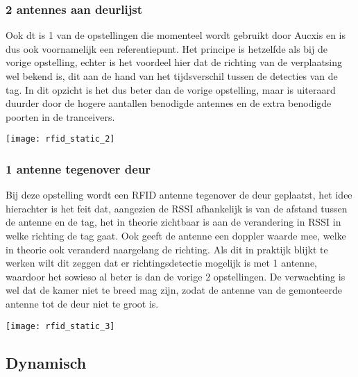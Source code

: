 \subsubsection{2 antennes aan deurlijst}
\begin{minipage}{0.65\textwidth}
Ook dt is 1 van de opstellingen die momenteel wordt gebruikt door Aucxis en is dus ook voornamelijk een referentiepunt. Het principe is hetzelfde als bij de vorige opstelling, echter is het voordeel hier dat de richting van de verplaatsing wel bekend is, dit aan de hand van het tijdsverschil tussen de detecties van de tag. In dit opzicht is het dus beter dan de vorige opstelling, maar is uiteraard duurder door de hogere aantallen benodigde antennes en de extra benodigde poorten in de tranceivers.
\end{minipage}
\hfill
\begin{minipage}{0.30\textwidth}
	\texttt{[image: rfid\_static\_2]}
\end{minipage}

\subsubsection{1 antenne tegenover deur}
\begin{minipage}{0.65\textwidth}
Bij deze opstelling wordt een RFID antenne tegenover de deur geplaatst, het idee hierachter is het feit dat, aangezien de RSSI afhankelijk is van de afstand tussen de antenne en de tag, het in theorie zichtbaar is aan de verandering in RSSI in welke richting de tag gaat. Ook geeft de antenne een doppler waarde mee, welke in theorie ook veranderd naargelang de richting. Als dit in praktijk blijkt te werken wilt dit zeggen dat er richtingsdetectie mogelijk is met 1 antenne, waardoor het sowieso al beter is dan de vorige 2 opstellingen. De verwachting is wel dat de kamer niet te breed mag zijn, zodat de antenne van de gemonteerde antenne tot de deur niet te groot is.
\end{minipage}
\hfill
\begin{minipage}{0.30\textwidth}
	\texttt{[image: rfid\_static\_3]}
\end{minipage}
\subsection{Dynamisch}

